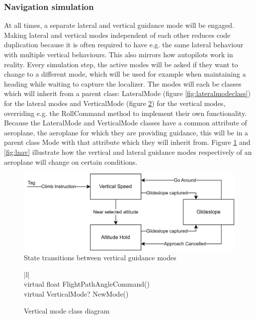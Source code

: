 \documentclass{article}
\begin{document}
\subsubsection{Navigation simulation}
At all times, a separate lateral and vertical guidance mode will be engaged.
Making lateral and vertical modes independent of each other reduces code duplication because it is often required to have e.g. the same lateral behaviour with multiple vertical behaviours.
This also mirrors how autopilots work in reality.
Every simulation step, the active modes will be asked if they want to change to a different mode, which will be used for example when maintaining a heading while waiting to capture the localizer.
The modes will each be classes which will inherit from a parent class: LateralMode (figure \ref{fig:lateralmodeclass}) for the lateral modes and VerticalMode (figure \ref{fig:verticalmodeclass}) for the vertical modes, overriding e.g. the RollCommand method to implement their own functionality.
Because the LateralMode and VerticalMode classes have a common attribute of aeroplane, the aeroplane for which they are providing guidance, this will be in a parent class Mode with that attribute which they will inherit from.
Figure \ref{fig:vertnav} and \ref{fig:lnav} illustrate how the vertical and lateral guidance modes respectively of an aeroplane will change on certain conditions.
\begin{figure}[H]
\centering
\includegraphics{diagrams/vertnav.png}
\caption{\label{fig:vertnav}State transitions between vertical guidance modes}
\end{figure}

\begin{figure}[H]
\centering
\begin{tabular}{ |l| } 
\hline
{} \\
\hline
virtual float FlightPathAngleCommand() \\
virtual VerticalMode? NewMode() \\
\hline
\end{tabular}
\caption{\label{fig:verticalmodeclass}Vertical mode class diagram}
\end{figure}
\end{document}

